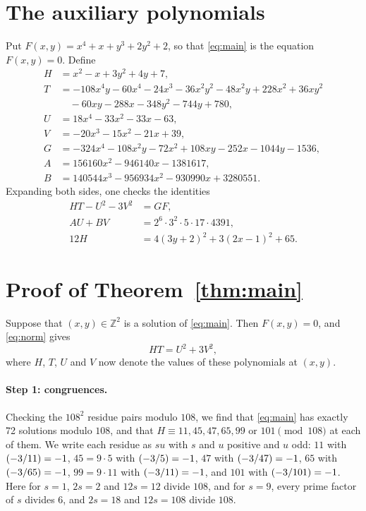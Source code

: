 \documentclass[11pt]{article}
\newcommand{\Z}{\mathbb{Z}}
\newcommand{\leg}[2]{\mathchoice{\biggl(\dfrac{#1}{#2}\biggr)}{(#1/#2)}{(#1/#2)}{(#1/#2)}}
\begin{document}
\section{The auxiliary polynomials}

Put $F(x,y)=x^{4}+x+y^{3}+2y^{2}+2$, so that \eqref{eq:main} is the equation $F(x,y)=0$. Define
\begin{align*}
H&=x^{2}-x+3y^{2}+4y+7,\\
T&=-108x^{4}y-60x^{4}-24x^{3}-36x^{2}y^{2}-48x^{2}y+228x^{2}+36xy^{2}\\
&\quad-60xy-288x-348y^{2}-744y+780,\\
U&=18x^{4}-33x^{2}-33x-63,\\
V&=-20x^{3}-15x^{2}-21x+39,\\
G&=-324x^{4}-108x^{2}y-72x^{2}+108xy-252x-1044y-1536,\\
A&=156160x^{2}-946140x-1381617,\\
B&=140544x^{3}-956934x^{2}-930990x+3280551.
\end{align*}
Expanding both sides, one checks the identities
\begin{align}
HT-U^2-3V^2&=GF,\label{eq:norm}\\
AU+BV&=2^{6}\cdot 3^{2}\cdot 5\cdot 17\cdot 4391,\label{eq:bezout}\\
12H&=4(3y+2)^2+3(2x-1)^2+65.\label{eq:sign}
\end{align}

\section{Proof of Theorem~\ref{thm:main}}

Suppose that $(x,y)\in\Z^2$ is a solution of \eqref{eq:main}. Then $F(x,y)=0$, and \eqref{eq:norm} gives
\begin{equation}\label{eq:HT}
HT=U^2+3V^2,
\end{equation}
where $H$, $T$, $U$ and $V$ now denote the values of these polynomials at $(x,y)$.

\paragraph{Step 1: congruences.} Checking the $108^2$ residue pairs modulo $108$, we find that \eqref{eq:main} has exactly 72 solutions modulo $108$, and that $H\equiv11,\allowbreak 45,\allowbreak 47,\allowbreak 65,\allowbreak 99\text{ or }101\pmod{108}$ at each of them. We write each residue as $su$ with $s$ and $u$ positive and $u$ odd: $11$ with $\leg{-3}{11}=-1$, $45=9\cdot5$ with $\leg{-3}{5}=-1$, $47$ with $\leg{-3}{47}=-1$, $65$ with $\leg{-3}{65}=-1$, $99=9\cdot11$ with $\leg{-3}{11}=-1$, and $101$ with $\leg{-3}{101}=-1$. Here for $s=1$, $2s=2$ and $12s=12$ divide $108$, and for $s=9$, every prime factor of $s$ divides $6$, and $2s=18$ and $12s=108$ divide $108$.
\end{document}
